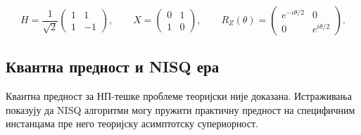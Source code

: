 
\[
  H = \frac{1}{\sqrt{2}}\begin{pmatrix}1 & 1\\ 1 & -1\end{pmatrix}, \qquad
  X = \begin{pmatrix}0 & 1\\ 1 & 0\end{pmatrix}, \qquad
  R_Z(\theta) = \begin{pmatrix}e^{-i\theta/2} & 0\\ 0 & e^{i\theta/2}\end{pmatrix}.
\]


\subsection{Квантна предност и NISQ ера}



\begin{remark}
Квантна предност за НП-тешке проблеме теоријски није доказана.
Истраживања показују да NISQ алгоритми могу пружити практичну предност
на специфичним инстанцама пре него теоријску асимптотску супериорност.
\end{remark}
